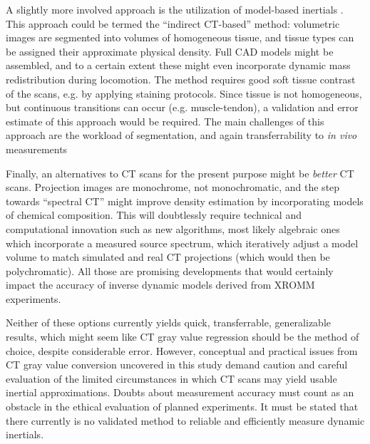 A slightly more involved approach is the utilization of model-based inertials \citep{Hutchinson2007,Allen2009}.
This approach could be termed the ``indirect CT-based'' method: volumetric images are segmented into volumes of homogeneous tissue, and tissue types can be assigned their approximate physical density.
Full CAD models might be assembled, and to a certain extent these might even incorporate dynamic mass redistribution during locomotion.
The method requires good soft tissue contrast of the scans, e.g. by applying staining protocols.
Since tissue is not homogeneous, but continuous transitions can occur (e.g. muscle-tendon), a validation and error estimate of this approach would be required.
The main challenges of this approach are the workload of segmentation, and again transferrability to \emph{in vivo} measurements


Finally, an alternatives to CT scans for the present purpose might be \emph{better} CT scans.
Projection images are monochrome, not monochromatic, and the step towards ``spectral CT'' might improve density estimation by incorporating models of chemical composition.
This will doubtlessly require technical and computational innovation such as new algorithms, most likely algebraic ones which incorporate a measured source spectrum, which iteratively adjust a model volume to match simulated and real CT projections (which would then be polychromatic).
All those are promising developments that would certainly impact the accuracy of inverse dynamic models derived from XROMM experiments.



Neither of these options currently yields quick, transferrable, generalizable results, which might seem like CT gray value regression should be the method of choice, despite considerable error.
However, conceptual and practical issues from CT gray value conversion uncovered in this study demand caution and careful evaluation of the limited circumstances in which CT scans may yield usable inertial approximations.
Doubts about measurement accuracy must count as an obstacle in the ethical evaluation of planned experiments.
It must be stated that there currently is no validated method to reliable and efficiently measure dynamic inertials.


\clearpage
